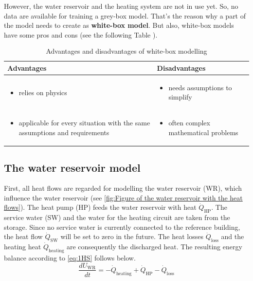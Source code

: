     \newline
    However, the water reservoir and the heating system are not in use yet. So, no data are available for training a grey-box model. That's the reason why a part of the model needs to create as \textbf{white-box model}.
    \newline
    But also, white-box models have some pros and cons (see the following Table \cite{EstradaFlores.2006}).
    \begin{table}[]
    \label{tab:wihte-boxpro}
        \centering
        \begin{tabular}{p{7.3cm} | p{7.3cm}}
        \hline
          Advantages  &  Disadvantages\\
        \hline
        \begin{itemize}
            \item relies on physics
        \end{itemize}
      & \begin{itemize}
            \item needs assumptions to simplify 
        \end{itemize}\\
     \begin{itemize}
            \item applicable for every situation with the same assumptions and requirements 
        \end{itemize} & \begin{itemize}
            \item often complex mathematical problems
        \end{itemize}\\
        \end{tabular}
        \caption {Advantages and disadvantages of white-box modelling}
    \end{table}


    \subsection{The water reservoir model}
    \label{waterModel}
    First, all heat flows are regarded for modelling the water reservoir (WR), which influence the water reservoir (see \autoref{fig:Figure of the water reservoir with the heat flows}). The heat pump (HP) feeds the water reservoir with heat $\dot{Q}_\text{HP}$. The service water (SW) and the water for the heating circuit are taken from the storage. Since no service water is currently connected to the reference building, the heat flow $\dot{Q}_\text{SW}$ will be set to zero in the future. The heat losses $\dot{Q}_\text{loss}$ and the heating heat $\dot{Q}_\text{heating}$ are consequently the discharged heat. The resulting energy balance according to \autoref{eq:1HS} follows below.
    \begin{equation}
        \label{waterReservoir}
        \frac{d U_\text{WR}}{d t}= -\dot{Q}_\text{heating} + \dot{Q}_\text{HP} - \dot{Q}_\text{loss}
    \end{equation}
    
